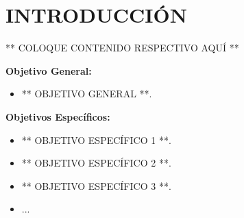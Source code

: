 \chapter*{INTRODUCCIÓN}
\thispagestyle{empty}

** COLOQUE CONTENIDO RESPECTIVO AQUÍ **

\textbf{Objetivo General:}

\begin{itemize}
    \item ** OBJETIVO GENERAL **.
\end{itemize}

\textbf{Objetivos Específicos:}

\begin{itemize}
    \item ** OBJETIVO ESPECÍFICO 1 **.
    \item ** OBJETIVO ESPECÍFICO 2 **.
    \item ** OBJETIVO ESPECÍFICO 3 **.
    \item ...
\end{itemize}
